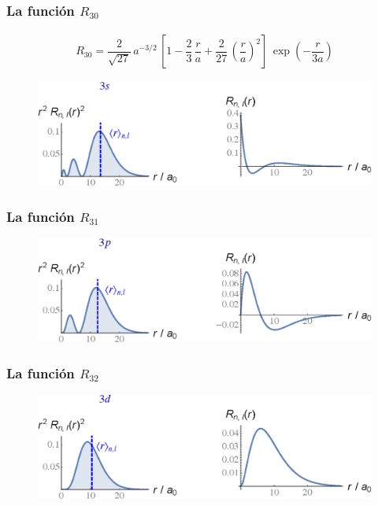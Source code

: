 \begin{frame}
\frametitle{La función $R_{30}$}
\begin{align*}
R_{30} = \dfrac{2}{\sqrt{27}} \, a^{-3/2} \, \left[ 1 {-} \dfrac{2}{3} \, \dfrac{r}{a} {+} \dfrac{2}{27} \, \left( \dfrac{r}{a} \right)^{2} \right] \, \exp(-\dfrac{r}{3a})
\end{align*}
\pause
\vspace*{-0.5cm}
\begin{figure}
   \centering
   \includegraphics[scale=0.67]{Imagenes/Plot_Funcion_Radial_30.eps}
\end{figure}
\end{frame}
\begin{frame}
   \frametitle{La función $R_{31}$}
\begin{figure}
   \centering
   \includegraphics[scale=0.67]{Imagenes/Plot_Funcion_Radial_31.eps}
\end{figure}
\end{frame}
\begin{frame}
\frametitle{La función $R_{32}$}
\begin{figure}
   \centering
   \includegraphics[scale=0.67]{Imagenes/Plot_Funcion_Radial_32.eps}
\end{figure}
\end{frame}
